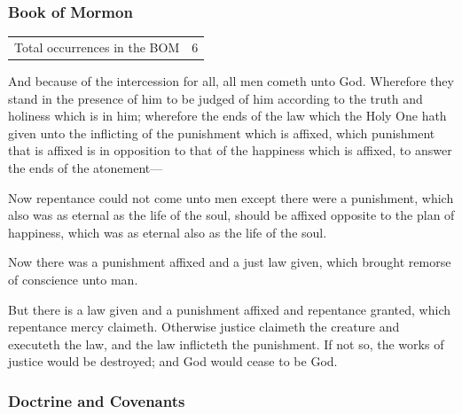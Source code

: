 		
	\subsubsection{Book of Mormon} %
		\label{AFFIX-BOM}
	
		\begin{tabular}{ll}
			Total occurrences in the BOM & 6
		\end{tabular}
		
		\begin{compactdesc}
			\item[{\hyperref[2NEPHI-2-10]{2 Nephi 2:10}}] And because of the intercession for all, all men cometh unto God. Wherefore they stand in the presence of him to be judged of him according to the truth and holiness which is in him; wherefore the ends of the law which the Holy One hath given unto the inflicting of the punishment which is affixed, which punishment that is affixed is in opposition to that of the happiness which is affixed, to answer the ends of the atonement---
			\item[{\hyperref[ALMA-42-16]{Alma 42:16}}] Now repentance could not come unto men except there were a punishment, which also was as eternal as the life of the soul, should be affixed opposite to the plan of happiness, which was as eternal also as the life of the soul.
			\item[{\hyperref[ALMA-42-18]{Alma 42:18}}] Now there was a punishment affixed and a just law given, which brought remorse of conscience unto man.
			\item[{\hyperref[ALMA-42-22]{Alma 42:22}}] But there is a law given and a punishment affixed and repentance granted, which repentance mercy claimeth. Otherwise justice claimeth the creature and executeth the law, and the law inflicteth the punishment. If not so, the works of justice would be destroyed; and God would cease to be God.
		\end{compactdesc}
		
	\subsubsection{Doctrine and Covenants} %
		\label{AFFIX-DC}
	
